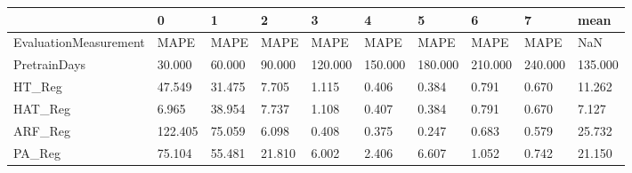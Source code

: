 \begin{tabular}{llllllllll}
\toprule
{} &       0 &      1 &      2 &       3 &       4 &       5 &       6 &       7 &    mean \\
\midrule
EvaluationMeasurement &    MAPE &   MAPE &   MAPE &    MAPE &    MAPE &    MAPE &    MAPE &    MAPE &     NaN \\
PretrainDays          &  30.000 & 60.000 & 90.000 & 120.000 & 150.000 & 180.000 & 210.000 & 240.000 & 135.000 \\
HT\_Reg                &  47.549 & 31.475 &  7.705 &   1.115 &   0.406 &   0.384 &   0.791 &   0.670 &  11.262 \\
HAT\_Reg               &   6.965 & 38.954 &  7.737 &   1.108 &   0.407 &   0.384 &   0.791 &   0.670 &   7.127 \\
ARF\_Reg               & 122.405 & 75.059 &  6.098 &   0.408 &   0.375 &   0.247 &   0.683 &   0.579 &  25.732 \\
PA\_Reg                &  75.104 & 55.481 & 21.810 &   6.002 &   2.406 &   6.607 &   1.052 &   0.742 &  21.150 \\
\bottomrule
\end{tabular}
